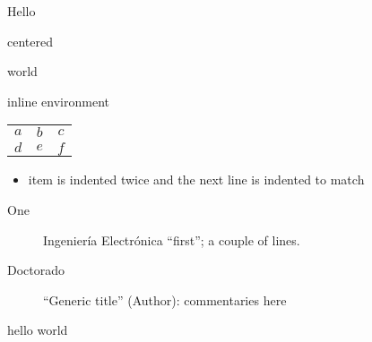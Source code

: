 \documentclass{minimal}
\begin{document}
  Hello
      \begin{centering} centered \end{centering}
    world

\begin{outer}
  \begin{inner} inline environment \end{inner}
\end{outer}

\begin{tabular}{%
  ccc}
  $a$ & $b$ & $c$ \\
  $d$ & $e$ & $f$
\end{tabular}

\begin{itemize}
\item item is indented twice
      and the next line is indented to match
  \end{itemize}

  \begin{description}
    \item[One] Ingeniería Electrónica ``first'';
    a couple of lines.
  \item[Doctorado] ``Generic title''
    (Author): commentaries here
  \end{description}

\begin{mydocument}
  hello world
  \end{mydocument}
\end{document}
